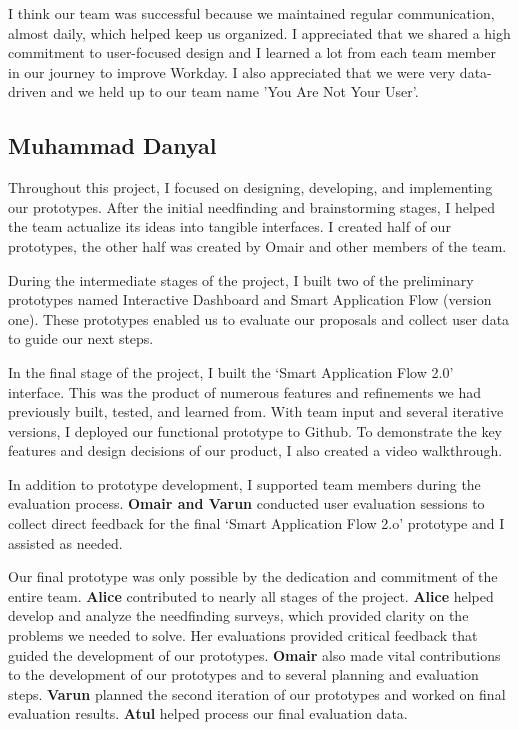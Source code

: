 \documentclass[
	letterpaper, %
]{jdf}
\begin{document}
\begin{sloppypar}
I think our team was successful because we maintained regular communication, almost daily, which helped keep us organized. I appreciated that we shared a high commitment to user-focused design and I learned a lot from each team member in our journey to improve Workday. I also appreciated that we were very data-driven and we held up to our team name 'You Are Not Your User'.  

\newpage

\subsection{Muhammad Danyal}
Throughout this project, I focused on designing, developing, and implementing our prototypes. After the initial needfinding and brainstorming stages, I helped the team actualize its ideas into tangible interfaces. I created half of our prototypes, the other half was created by Omair and other members of the team.

During the intermediate stages of the project, I built two of the preliminary prototypes named Interactive Dashboard and Smart Application Flow (version one). These prototypes enabled us to evaluate our proposals and collect user data to guide our next steps.

In the final stage of the project, I built the ‘Smart Application Flow 2.0’ interface. This was the product of numerous features and refinements we had previously built, tested, and learned from. With team input and several iterative versions, I deployed our functional prototype to Github. To demonstrate the key features and design decisions of our product, I also created a video walkthrough.

In addition to prototype development, I supported team members during the evaluation process. \textbf{Omair and Varun} conducted user evaluation sessions to collect direct feedback for the final ‘Smart Application Flow 2.o’ prototype and I assisted as needed.

Our final prototype was only possible by the dedication and commitment of the entire team. \textbf{Alice} contributed to nearly all stages of the project. \textbf{Alice} helped develop and analyze the needfinding surveys, which provided clarity on the problems we needed to solve. Her evaluations provided critical feedback that guided the development of our prototypes. \textbf{Omair} also made vital contributions to the development of our prototypes and to several planning and evaluation steps. \textbf{Varun} planned the second iteration of our prototypes and worked on final evaluation results. \textbf{Atul} helped process our final evaluation data. 


\end{sloppypar}
\end{document}
